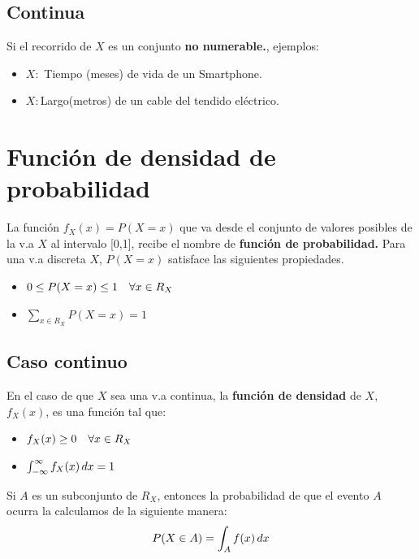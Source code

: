 \documentclass[12pt,twocolumn,a4paper]{report}
\begin{document}
\subsection*{Continua}
Si el recorrido de $X$ es un conjunto \textbf{ no numerable.}, ejemplos:
\begin{itemize}
\setlength\itemsep{0.001cm}
\item{$X:$ Tiempo (meses) de vida de un Smartphone.}
\item{$X: $Largo(metros) de un cable del tendido eléctrico.}
\end{itemize}

\section*{Función de densidad de probabilidad}
La función $f_X(x) = P(X = x)$ que va desde el conjunto de valores posibles de la v.a $X$ al intervalo [0,1], recibe el nombre de \textbf{función de probabilidad.} Para una v.a discreta $X$, $P(X = x)$ satisface las siguientes propiedades. 
\begin{itemize}
\setlength\itemsep{0.001cm}
\centering 
\item{$ 0 \leq P(X = x) \leq 1 \hspace{10px} \forall x \in R_X$}
\item{$\sum_{x\in R_X} P(X = x) = 1$}
\end{itemize}

\subsection*{Caso continuo}
En el caso de que $X$ sea una v.a continua, la \textbf{función de densidad} de $X$, $f_X(x)$, es una función tal que:
\begin{itemize}
\setlength\itemsep{0.001cm}
\item{$ f_X(x) \geq 0 \hspace{10px} \forall x \in R_X$}
\item{$\int_{- \infty}^{\infty}f_X(x)\thinspace dx = 1$}
\end{itemize}

Si $A$ es un subconjunto de $R_X$, entonces la probabilidad de que el evento $A$ ocurra la calculamos de la siguiente manera: 
$$
P(X \in A) = \int_{A} f(x) \thinspace dx 
$$
\end{document}
